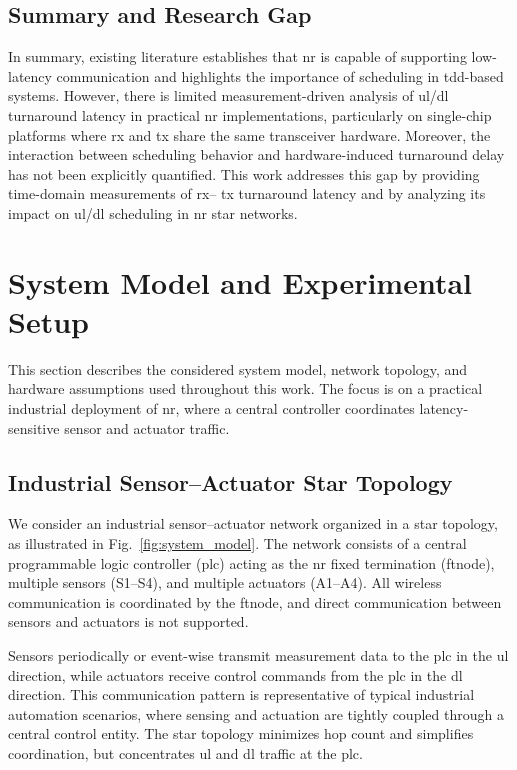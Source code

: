 \documentclass[conference]{IEEEtran}
\begin{document}
\subsection{Summary and Research Gap}
In summary, existing literature establishes that \gls{nr} is capable of supporting low-latency communication and highlights the importance of scheduling in \gls{tdd}-based systems. However, there is limited measurement-driven analysis of \gls{ul}/\gls{dl} turnaround latency in practical \gls{nr} implementations, particularly on single-chip platforms where  \gls{rx} and  \gls{tx} share the same transceiver hardware. Moreover, the interaction between scheduling behavior and hardware-induced turnaround delay has not been explicitly quantified. This work addresses this gap by providing time-domain measurements of  \gls{rx}-- \gls{tx} turnaround latency and by analyzing its impact on \gls{ul}/\gls{dl} scheduling in \gls{nr} star networks.


\section{System Model and Experimental Setup}
This section describes the considered system model, network topology, and hardware assumptions used throughout this work. The focus is on a practical industrial deployment of \gls{nr}, where a central controller coordinates latency-sensitive sensor and actuator traffic.

\subsection{Industrial Sensor--Actuator Star Topology}

We consider an industrial sensor--actuator network organized in a star topology, as illustrated in Fig.~\ref{fig:system_model}. The network consists of a central programmable logic controller (\gls{plc}) acting as the \gls{nr} fixed termination (\gls{ftnode}), multiple sensors (S1--S4), and multiple actuators (A1--A4). All wireless communication is coordinated by the \gls{ftnode}, and direct communication between sensors and actuators is not supported.

Sensors periodically or event-wise transmit measurement data to the \gls{plc} in the \gls{ul} direction, while actuators receive control commands from the \gls{plc} in the \gls{dl} direction. This communication pattern is representative of typical industrial automation scenarios, where sensing and actuation are tightly coupled through a central control entity. The star topology minimizes hop count and simplifies coordination, but concentrates \gls{ul} and \gls{dl} traffic at the \gls{plc}.
\end{document}
